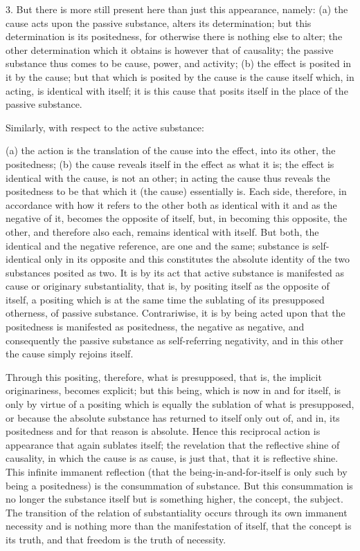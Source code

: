3. But there is more still present here
than just this appearance, namely:
(a) the cause acts upon the passive substance,
alters its determination;
but this determination is its positedness,
for otherwise there is nothing else to alter;
the other determination which it obtains
is however that of causality;
the passive substance thus comes to be
cause, power, and activity;
(b) the effect is posited in it by the cause;
but that which is posited by the cause is the cause itself
which, in acting, is identical with itself;
it is this cause that posits itself
in the place of the passive substance.

Similarly, with respect to the active substance:

(a) the action is the translation of the cause into the effect,
into its other, the positedness;
(b) the cause reveals itself in the effect as what it is;
the effect is identical with the cause, is not an other;
in acting the cause thus reveals the positedness to be
that which it (the cause) essentially is.
Each side, therefore, in accordance with
how it refers to the other
both as identical with it and as the negative of it,
becomes the opposite of itself, but,
in becoming this opposite, the other,
and therefore also each,
remains identical with itself.
But both, the identical and the negative reference,
are one and the same;
substance is self-identical only in its opposite
and this constitutes the absolute identity of
the two substances posited as two.
It is by its act that active substance is
manifested as cause or originary substantiality, that is,
by positing itself as the opposite of itself,
a positing which is at the same time
the sublating of its presupposed otherness,
of passive substance.
Contrariwise, it is by being acted upon
that the positedness is manifested as positedness,
the negative as negative,
and consequently the passive substance as self-referring negativity,
and in this other the cause simply rejoins itself.

Through this positing, therefore, what is presupposed,
that is, the implicit originariness, becomes explicit;
but this being, which is now in and for itself,
is only by virtue of a positing
which is equally the sublation
of what is presupposed,
or because the absolute substance
has returned to itself only
out of, and in, its positedness
and for that reason is absolute.
Hence this reciprocal action is
appearance that again sublates itself;
the revelation that the reflective shine of causality,
in which the cause is as cause,
is just that, that it is reflective shine.
This infinite immanent reflection
(that the being-in-and-for-itself is
only such by being a positedness)
is the consummation of substance.
But this consummation is
no longer the substance itself
but is something higher,
the concept, the subject.
The transition of the relation of substantiality
occurs through its own immanent necessity
and is nothing more than the manifestation of itself,
that the concept is its truth,
and that freedom is the truth of necessity.

